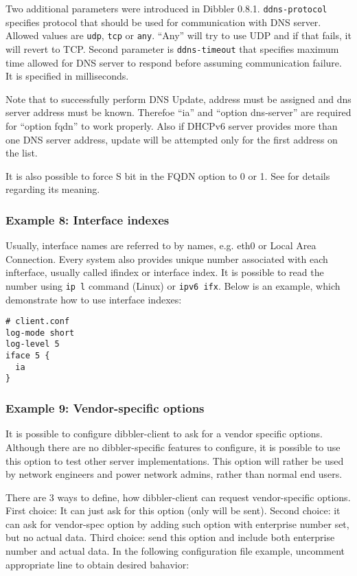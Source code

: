 Two additional parameters were introduced in Dibbler
0.8.1. \verb+ddns-protocol+ specifies protocol that should be used for
communication with DNS server.  Allowed values
are \verb+udp+, \verb+tcp+ or \verb+any+. ``Any'' will try to use UDP
and if that fails, it will revert to TCP. Second parameter
is \verb+ddns-timeout+ that specifies maximum time allowed for DNS
server to respond before assuming communication failure. It is
specified in milliseconds.

Note that to successfully perform DNS Update, address must be assigned
and dns server address must be known. Therefoe  ``ia'' and ``option
dns-server'' are required for ``option fqdn'' to work properly. Also if
DHCPv6 server provides more than one DNS server address, update will
be attempted only for the first address on the list.

It is also possible to force S bit in the FQDN option to 0 or 1. See
\cite{rfc4704} for details regarding its meaning.

\subsubsection{Example 8: Interface indexes}
Usually, interface names are referred to by names, e.g. eth0 or Local
Area Connection. Every system also provides unique number associated
with each infterface, usually called ifindex or interface index. It is
possible to read the number using \verb+ip l+ command (Linux) or
\verb+ipv6 ifx+. Below is an example, which demonstrate how to use
interface indexes:

\begin{lstlisting}
# client.conf
log-mode short
log-level 5
iface 5 {
  ia
}
\end{lstlisting}

\subsubsection{Example 9: Vendor-specific options}
\label{example-client-vendor-spec}
It is possible to configure dibbler-client to ask for a vendor specific
options. Although there are no dibbler-specific features to configure,
it is possible to use this option to test other server
implementations. This option will rather be used by network engineers
and power network admins, rather than normal end users.

There are 3 ways to define, how dibbler-client can request
vendor-specific options. First choice: It can just ask for this option (only
 will be sent). Second choice: it can ask for
vendor-spec option by adding such option with enterprise number set, but
no actual data. Third choice: send this option and include both
enterprise number and actual data. In the following configuration file
example, uncomment appropriate line to obtain desired bahavior:

